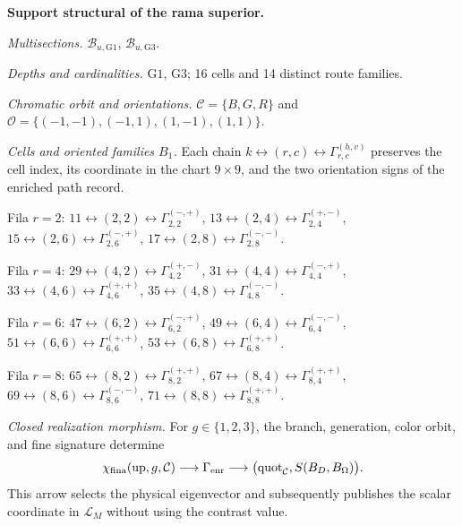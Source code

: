 \noindent\textbf{Support structural of the rama superior.}\par
\noindent\textit{Multisections.} \(\mathcal B_{u,\mathrm{G1}}\), \(\mathcal B_{u,\mathrm{G3}}\).\par
\noindent\textit{Depths and cardinalities.} $\mathrm{G1}$, $\mathrm{G3}$; 16 cells and 14 distinct route families.\par
\noindent\textit{Chromatic orbit and orientations.} $\mathcal C=\{B,G,R\}$ and $\mathcal O=\{(-1,-1),(-1,1),(1,-1),(1,1)\}$.\par
\noindent\textit{Cells and oriented families $B_1$.} Each chain $k\leftrightarrow(r,c)\leftrightarrow\Gamma_{r,c}^{(h,v)}$ preserves the cell index, its coordinate in the chart $9\times9$, and the two orientation signs of the enriched path record.\par
\noindent Fila $r=2$: $11\leftrightarrow(2,2)\leftrightarrow\Gamma_{2,2}^{(-,+)}$, $13\leftrightarrow(2,4)\leftrightarrow\Gamma_{2,4}^{(+,-)}$, $15\leftrightarrow(2,6)\leftrightarrow\Gamma_{2,6}^{(-,+)}$, $17\leftrightarrow(2,8)\leftrightarrow\Gamma_{2,8}^{(-,-)}$.\par
\noindent Fila $r=4$: $29\leftrightarrow(4,2)\leftrightarrow\Gamma_{4,2}^{(+,-)}$, $31\leftrightarrow(4,4)\leftrightarrow\Gamma_{4,4}^{(-,+)}$, $33\leftrightarrow(4,6)\leftrightarrow\Gamma_{4,6}^{(+,+)}$, $35\leftrightarrow(4,8)\leftrightarrow\Gamma_{4,8}^{(-,-)}$.\par
\noindent Fila $r=6$: $47\leftrightarrow(6,2)\leftrightarrow\Gamma_{6,2}^{(-,+)}$, $49\leftrightarrow(6,4)\leftrightarrow\Gamma_{6,4}^{(-,-)}$, $51\leftrightarrow(6,6)\leftrightarrow\Gamma_{6,6}^{(+,+)}$, $53\leftrightarrow(6,8)\leftrightarrow\Gamma_{6,8}^{(+,+)}$.\par
\noindent Fila $r=8$: $65\leftrightarrow(8,2)\leftrightarrow\Gamma_{8,2}^{(+,+)}$, $67\leftrightarrow(8,4)\leftrightarrow\Gamma_{8,4}^{(+,+)}$, $69\leftrightarrow(8,6)\leftrightarrow\Gamma_{8,6}^{(-,-)}$, $71\leftrightarrow(8,8)\leftrightarrow\Gamma_{8,8}^{(+,+)}$.\par
\noindent\textit{Closed realization morphism.} For $g\in\{1,2,3\}$, the branch, generation, color orbit, and fine signature determine
\[\chi_{\rm fina}(\operatorname{up},g,\mathcal C)\longrightarrow\Gamma_{\rm enr}\longrightarrow\bigl(\operatorname{quot}_{\mathcal C},S(B_D,B_\Omega)\bigr).\]
This arrow selects the physical eigenvector and subsequently publishes the scalar coordinate in $\mathcal L_M$ without using the contrast value.\par
